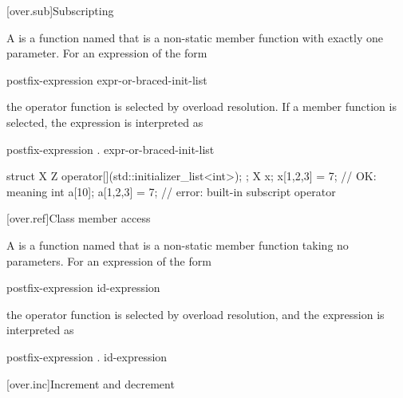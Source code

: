 [over.sub]{Subscripting}%
%

\pnum
A 
is a function named 
that is a non-static member function with exactly one parameter.
For an expression of the form
\begin{ncsimplebnf}
postfix-expression \terminal{[} expr-or-braced-init-list \terminal{]}
\end{ncsimplebnf}
the operator function
is selected by overload resolution.
If a member function is selected,
the expression is interpreted as
\begin{ncsimplebnf}
postfix-expression .  \terminal{[}\terminal{]} \terminal{(} expr-or-braced-init-list \terminal{)}
\end{ncsimplebnf}

\pnum
\begin{example}
\begin{codeblock}
struct X {
  Z operator[](std::initializer_list<int>);
};
X x;
x[{1,2,3}] = 7;                 // OK: meaning 
int a[10];
a[{1,2,3}] = 7;                 // error: built-in subscript operator
\end{codeblock}
\end{example}

[over.ref]{Class member access}
%

\pnum
A 
is a function named 
that is a non-static member function taking no parameters.
For an expression of the form
\begin{ncsimplebnf}
postfix-expression \terminal{->}  id-expression
\end{ncsimplebnf}
the operator function
is selected by overload resolution,
and the expression is interpreted as
\begin{ncsimplebnf}
\terminal{(} postfix-expression .  \terminal{->} \terminal{(}\terminal{)} \terminal{)} \terminal{->}  id-expression
\end{ncsimplebnf}

[over.inc]{Increment and decrement}
%
%
%
%

